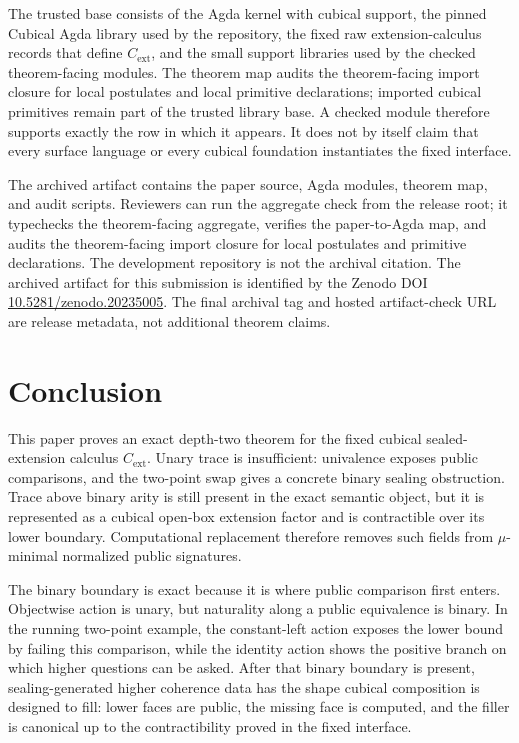 \documentclass{lmcs}
\begin{document}
The trusted base consists of the Agda kernel with cubical support, the pinned
Cubical Agda library used by the repository, the fixed raw extension-calculus
records that define \(C_{\mathrm{ext}}\), and the small support libraries used by
the checked theorem-facing modules.  The theorem map audits the theorem-facing import
closure for local postulates and local primitive declarations; imported cubical
primitives remain part of the trusted library base.  A checked module therefore
supports exactly the row in which it appears.  It does not by itself claim that
every surface language or every cubical foundation instantiates the fixed
interface.

The archived artifact contains the paper source, Agda modules, theorem map, and
audit scripts.  Reviewers can run the aggregate check
from the release root; it typechecks the theorem-facing aggregate, verifies the
paper-to-Agda map, and audits the theorem-facing import closure for local
postulates and primitive declarations.  The development repository is not the
archival citation.  The archived artifact for this submission is identified by
the Zenodo DOI
\href{https://doi.org/10.5281/zenodo.20235005}{10.5281/zenodo.20235005}.
The final archival tag and hosted artifact-check URL are release metadata, not
additional theorem claims.


\section{Conclusion}

This paper proves an exact depth-two theorem for the fixed cubical
sealed-extension calculus \(C_{\mathrm{ext}}\).  Unary trace is insufficient:
univalence exposes public comparisons, and the two-point swap gives a concrete
binary sealing obstruction.  Trace above binary arity is still present in the
exact semantic object, but it is represented as a cubical open-box extension
factor and is contractible over its lower boundary.  Computational replacement
therefore removes such fields from \(\mu\)-minimal normalized public signatures.

The binary boundary is exact because it is where public comparison first enters.
Objectwise action is unary, but naturality along a public equivalence is binary.
In the running two-point example, the constant-left action exposes the lower
bound by failing this comparison, while the identity action shows the positive
branch on which higher questions can be asked.  After that binary boundary is
present, sealing-generated higher coherence data has the shape cubical
composition is designed to fill: lower faces are public, the missing face is
computed, and the filler is canonical up to the contractibility proved in the
fixed interface.
\end{document}
